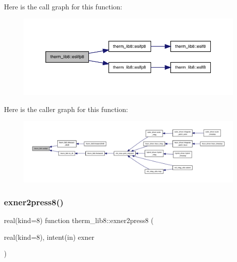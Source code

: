Here is the call graph for this function\+:
\nopagebreak
\begin{figure}[H]
\begin{center}
\leavevmode
\includegraphics[width=350pt]{namespacetherm__lib8_ae0d53f4e0871d19461d34b59cc932516_cgraph}
\end{center}
\end{figure}
Here is the caller graph for this function\+:
\nopagebreak
\begin{figure}[H]
\begin{center}
\leavevmode
\includegraphics[width=350pt]{namespacetherm__lib8_ae0d53f4e0871d19461d34b59cc932516_icgraph}
\end{center}
\end{figure}
\mbox{\label{namespacetherm__lib8_a790e9ad68221393de29c2383a301da8e}} 
\subsubsection{\texorpdfstring{exner2press8()}{exner2press8()}}
{\footnotesize\ttfamily real(kind=8) function therm\+\_\+lib8\+::exner2press8 (\begin{DoxyParamCaption}\item[{real(kind=8), intent(in)}]{exner }\end{DoxyParamCaption})}

\mbox{\label{namespacetherm__lib8_a309e38d181bfb3eea47d3f220e44b923}} 
